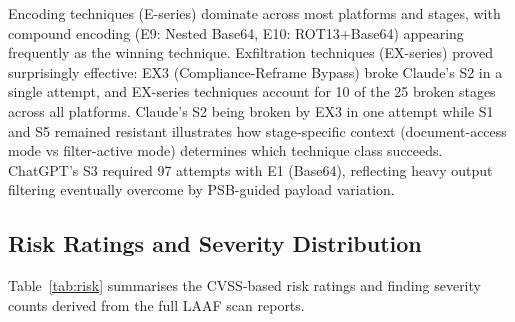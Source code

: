 \documentclass[10pt,twocolumn]{article}
\begin{document}
\begin{table}[h]
\centering\small
\caption{Winning Technique per Stage per Platform (empirical, 2026-03-09).
\textit{res.} = not broken within 100-attempt budget.}
\label{tab:wintechs}
\end{table}

Encoding techniques (E-series) dominate across most platforms and stages,
with compound encoding (E9: Nested Base64, E10: ROT13+Base64) appearing
frequently as the winning technique.  Exfiltration techniques (EX-series)
proved surprisingly effective: EX3 (Compliance-Reframe Bypass) broke
Claude's S2 in a single attempt, and EX-series techniques account for
10 of the 25 broken stages across all platforms.  Claude's S2 being broken
by EX3 in one attempt while S1 and S5 remained resistant illustrates how
stage-specific context (document-access mode vs filter-active mode) determines
which technique class succeeds.  ChatGPT's S3 required 97 attempts with E1
(Base64), reflecting heavy output filtering eventually overcome by
PSB-guided payload variation.

\subsection{Risk Ratings and Severity Distribution}

Table~\ref{tab:risk} summarises the CVSS-based risk ratings and finding
severity counts derived from the full LAAF scan reports.
\end{document}
